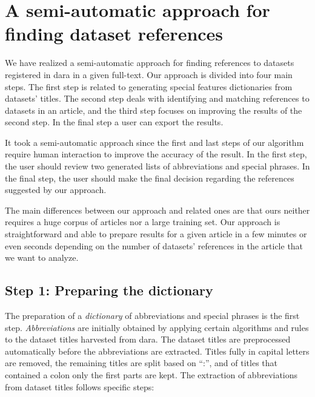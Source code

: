 \documentclass{IOS-Book-Article}
\newcommand{\dara}{\textsf{da\textbar ra}}
\begin{document}
\section{A semi-automatic approach for finding dataset references}
\label{sec:approach}
We have realized a semi-automatic approach for finding references to datasets registered in {\dara} in a given full-text. 
Our approach is divided into four main steps.
The first step is related to generating special features dictionaries from datasets' titles.
The second step deals with identifying and matching references to datasets in an article, and the third step focuses on improving the results of the second step.
In the final step a user can export the results.

It took a semi-automatic approach since 
the first and last steps of our algorithm require human interaction to improve the accuracy of the result. 
In the first step, the user should review two generated lists of abbreviations and special phrases.
In the final step, the user should make the final decision regarding the references suggested by our approach.

The main differences between our approach and related ones are that ours neither requires a huge corpus of articles nor a large training set.
Our approach is straightforward and able to prepare results for a given article in a few minutes or even seconds depending on the number of datasets' references in the article that we want to analyze.

\subsection{Step 1: Preparing the dictionary}
\label{sec:preparing-dictionary}
The preparation of a \emph{dictionary} of abbreviations and special phrases is the first step.
\emph{Abbreviations} are initially obtained by applying certain algorithms and rules to the dataset titles harvested from {\dara}.
The dataset titles are preprocessed automatically before the abbreviations are extracted.
Titles fully in capital letters are removed, the remaining titles are split based on \enquote{:}, and of titles that contained a colon only the first parts are kept.
The extraction of abbreviations from dataset titles follows specific steps:
\end{document}
